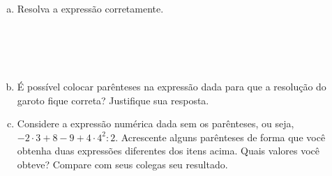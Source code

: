 \documentclass[a4paper,14pt]{article}
\begin{document}
\begin{multicols}{2}
\begin{enumerate}
\begin{enumerate}[a)]
				\item Resolva a expressão corretamente. \\\\\\\\\\
				\item É possível colocar parênteses na expressão dada para que a resolução do garoto fique correta? Justifique sua resposta. \newpage
				\item Considere a expressão numérica dada sem os parênteses, ou seja, $-2 \cdot 3 + 8 - 9 + 4 \cdot 4^2 : 2$.
				Acrescente alguns parênteses de forma que você obtenha duas expressões diferentes dos itens acima.
				Quais valores você obteve? Compare com seus colegas seu resultado. \\\\\\\\\\
			\end{enumerate}
		\end{enumerate}

\end{multicols}
\end{document}

